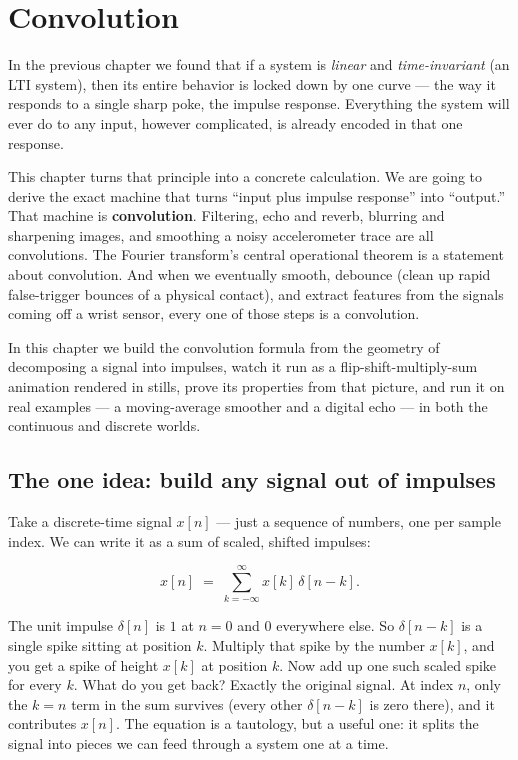 \chapter{Convolution}

In the previous chapter we found that if a system
is \emph{linear} and \emph{time-invariant} (an LTI system), then its entire
behavior is locked down by one curve --- the way it responds to a single sharp
poke, the impulse response. Everything the system will ever do to any input,
however complicated, is already encoded in that one response.

This chapter turns that principle into a concrete calculation. We are going to derive the exact
machine that turns ``input plus impulse response'' into ``output.'' That
machine is \textbf{convolution}. Filtering, echo and reverb, blurring and
sharpening images, and smoothing a noisy accelerometer trace are all
convolutions. The Fourier transform's central operational
theorem is a statement about convolution. And when we eventually smooth,
debounce (clean up rapid false-trigger bounces of a physical contact), and extract features from the signals coming off a wrist sensor, every one
of those steps is a convolution.

In this chapter we build the convolution formula from the geometry of decomposing a signal
into impulses, watch it run as a flip-shift-multiply-sum animation rendered in
stills, prove its properties from that picture, and run it on real examples ---
a moving-average smoother and a digital echo --- in both the continuous and
discrete worlds.

\chapterline

\section{The one idea: build any signal out of impulses}
\label{ch13:decompose}

Take a discrete-time
signal $x[n]$ --- just a sequence of numbers, one per sample index. We can write it
as a sum of scaled, shifted impulses:

\begin{equation}
\label{ch13:sifting-discrete}
x[n] \;=\; \sum_{k=-\infty}^{\infty} x[k]\,\delta[n-k].
\end{equation}

The unit impulse $\delta[n]$ is $1$ at $n=0$ and $0$
everywhere else. So $\delta[n-k]$ is a single spike sitting at position $k$.
Multiply that spike by the number $x[k]$, and you get a spike of height $x[k]$
at position $k$. Now add up one such scaled spike for every $k$. What do you
get back? Exactly the original signal. At index $n$, only the $k=n$ term in the
sum survives (every other $\delta[n-k]$ is zero there), and it contributes
$x[n]$. The equation is a tautology, but a useful one: it splits the signal into pieces we can feed through a system one at a time.

